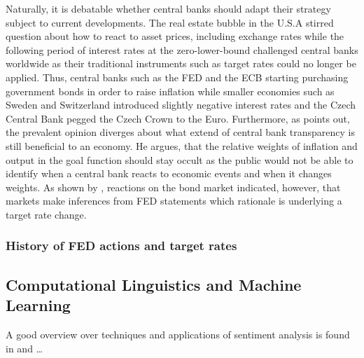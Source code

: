 Naturally, it is debatable whether central banks should adapt their strategy subject to current developments. The real estate bubble in the U.S.A stirred question about how to react to asset prices, including exchange rates while the following period of interest rates at the zero-lower-bound challenged central banks worldwide as their traditional instruments such as target rates could no longer be applied. Thus, central banks such as the FED and the ECB starting purchasing government bonds in order to raise inflation while smaller economies such as Sweden and Switzerland introduced slightly negative interest rates and the Czech Central Bank pegged the Czech Crown to the Euro. Furthermore, as \textcite{Mishkin.2007} points out, the prevalent opinion diverges about what extend of central bank transparency is still beneficial to an economy. He argues, that the relative weights of inflation and output in the goal function should stay occult as the public would not be able to identify when a central bank reacts to economic events and when it changes weights. As shown by \textcite{Ellingsen.2001}, reactions on the bond market indicated, however, that markets make inferences from FED statements which rationale is underlying a target rate change. %


\subsubsection{History of FED actions and target rates}


\subsection{Computational Linguistics and Machine Learning}

A good overview over techniques and applications of sentiment analysis is found in \textcite{Feldman.2013} and \textcite{Liu.2012} \dots


